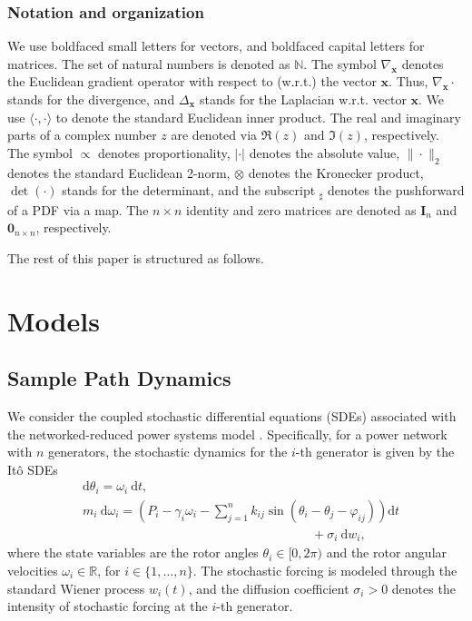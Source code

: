 \documentclass[10pt,twocolumn]{IEEEtran}
\newcommand{\red}{\color{red}}
\begin{document}
\subsubsection{Notation and organization}
We use boldfaced small letters for vectors, and boldfaced capital letters for matrices. The set of natural numbers is denoted as $\mathbb{N}$. The symbol $\nabla_{\bm{x}}$ denotes the Euclidean gradient operator with respect to (w.r.t.) the vector $\bm{x}$. Thus, $\nabla_{\bm{x}}\cdot$ stands for the divergence, and $\Delta_{\bm{x}}$ stands for the Laplacian w.r.t. vector $\bm{x}$. We use $\langle\cdot,\cdot\rangle$ to denote the standard Euclidean inner product. The real and imaginary parts of a complex number $z$ are denoted via $\Re(z)$ and $\Im(z)$, respectively. The symbol $\propto$ denotes proportionality, $|\cdot|$ denotes the absolute value, $\|\cdot\|_{2}$ denotes the standard Euclidean 2-norm, $\otimes$ denotes the Kronecker product, $\det(\cdot)$ stands for the determinant, and the subscript $_{\sharp}$ denotes the pushforward of a PDF via a map. The $n\times n$ identity and zero matrices are denoted as $\bm{I}_{n}$ and $\bm{0}_{n\times n}$, respectively.

The rest of this paper is structured as follows. {\red{TBD}}


\section{Models}\label{sec:models}

\subsection{Sample Path Dynamics}\label{subsec:samplepathdynamics}
We consider the coupled stochastic differential equations (SDEs) associated with the networked-reduced power systems model \cite[Ch. 7]{sauerpai1998}. Specifically, for a power network with $n$ generators, the stochastic dynamics for the $i$-th generator is given by the It\^{o} SDEs
\begin{subequations}
\begin{align}
&{\mathrm{d}}\theta_{i} = \omega_{i}\:{\mathrm{d}}t,\label{RotAngleGen}\\
&m_{i}\:{\mathrm{d}}\omega_{i} =	\left(\!P_{i} - \gamma_{i}\omega_{i} - \displaystyle\sum_{j=1}^{n} k_{ij}\sin\left(\theta_{i}-\theta_{j}-\varphi_{ij}\right)\!\right){\mathrm{d}}t \nonumber\\
&\qquad\qquad\qquad\qquad\qquad\qquad\qquad\qquad\qquad+\sigma_{i}\:{\mathrm{d}}w_{i},
\end{align}
\label{ItoSDEcomponentlevel}
\end{subequations}
where the state variables are the rotor angles $\theta_{i}\in[0,2\pi)$ and the rotor angular velocities $\omega_{i}\in\mathbb{R}$, for $i\in\{1,\hdots,n\}$. The stochastic forcing is modeled through the standard Wiener process $w_{i}(t)$, and the diffusion coefficient $\sigma_{i}>0$ denotes the intensity of stochastic forcing at the $i$-th generator. 
\end{document}
